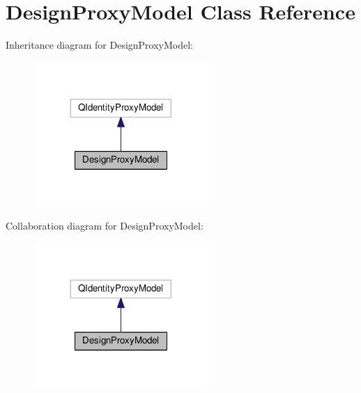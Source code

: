 \hypertarget{class_design_proxy_model}{}\section{Design\+Proxy\+Model Class Reference}
\label{class_design_proxy_model}


Inheritance diagram for Design\+Proxy\+Model\+:\nopagebreak
\begin{figure}[H]
\begin{center}
\leavevmode
\includegraphics[width=188pt]{class_design_proxy_model__inherit__graph}
\end{center}
\end{figure}


Collaboration diagram for Design\+Proxy\+Model\+:\nopagebreak
\begin{figure}[H]
\begin{center}
\leavevmode
\includegraphics[width=188pt]{class_design_proxy_model__coll__graph}
\end{center}
\end{figure}
